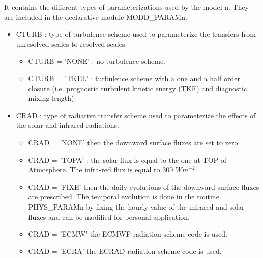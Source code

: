 It contains the different types of parameterizations used by the model n. They are
included in the declarative module MODD\_PARAMn. 
\begin{itemize}
\item
{}
CTURB :  type of turbulence scheme used to parameterize the transfers from
unresolved scales to resolved scales.
\begin{itemize}
\item
CTURB = 'NONE' : no turbulence scheme.
\item
CTURB = 'TKEL' : turbulence scheme with a one and a half  order closure
 (i.e.
 prognostic turbulent kinetic energy (TKE) and diagnostic mixing length).
\end{itemize}
 
\item
{}
CRAD  :  type of radiative transfer scheme used to parameterize the
effects of the solar and infrared radiations.
\begin{itemize}
\item
CRAD = 'NONE' then the downward surface fluxes are set to zero
\item
CRAD = 'TOPA' : the solar flux is equal to the one at TOP of Atmosphere. The infra-red flux is equal to 300 $Wm^{-2}$.
\item
CRAD = 'FIXE' then the daily evolutions of the downward surface
fluxes are prescribed. The temporal evolution is done in the routine
PHYS\_PARAMn by fixing the hourly value of the infrared and solar
fluxes and can be modified for personal application.
\item
CRAD = 'ECMW' the ECMWF radiation scheme code is used.
\item 
CRAD = 'ECRA' the ECRAD radiation scheme code is used.
\end{itemize} 


\end{itemize}
